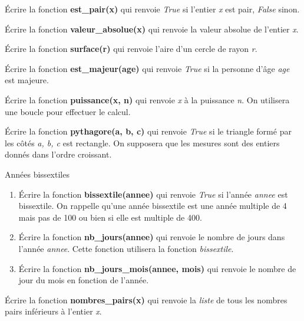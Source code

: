 \documentclass[a4paper,11pt]{article}
\begin{document}
\begin{Form}
\begin{exo}
Écrire la fonction \textbf{est\_pair(x)} qui renvoie \emph{True} si l'entier \emph{x} est pair, \emph{False} sinon.
\end{exo}
\begin{exo}
Écrire la fonction \textbf{valeur\_absolue(x)} qui renvoie la valeur absolue de l'entier \emph{x}.
\end{exo}
\begin{exo}
Écrire la fonction \textbf{surface(r)} qui renvoie l'aire d'un cercle de rayon \emph{r}.
\end{exo}
\begin{exo}
Écrire la fonction \textbf{est\_majeur(age)} qui renvoie \emph{True} si la personne d'âge \emph{age} est majeure.
\end{exo}
\begin{exo}
Écrire la fonction \textbf{puissance(x, n)} qui renvoie \emph{x} à la puissance \emph{n}. On utilisera une boucle pour effectuer le calcul.
\end{exo}
\begin{exo}
Écrire la fonction \textbf{pythagore(a, b, c)} qui renvoie \emph{True} si le triangle formé par les côtés \emph{a, b, c} est rectangle. On supposera que les mesures sont des entiers donnés dans l'ordre croissant.
\end{exo}
\begin{exo}
Années bissextiles
\begin{enumerate}
\item Écrire la fonction \textbf{bissextile(annee)} qui renvoie \emph{True} si l'année \emph{annee} est bissextile. On rappelle qu'une année bissextile est une année multiple de 4 mais pas de 100 ou bien si elle est multiple de 400.
\item Écrire la fonction \textbf{nb\_jours(annee)} qui renvoie le nombre de jours dans l'année \emph{annee}. Cette fonction utilisera la fonction \emph{bissextile}.
\item Écrire la fonction \textbf{nb\_jours\_mois(annee, mois)} qui renvoie le nombre de jour du mois en fonction de l'année.
\end{enumerate}
\end{exo}
\begin{exo}
Écrire la fonction \textbf{nombres\_pairs(x)} qui renvoie la \emph{liste} de tous les nombres pairs inférieurs à l'entier \emph{x}.
\end{exo}
\begin{exo}

\end{exo}
\end{Form}
\end{document}
